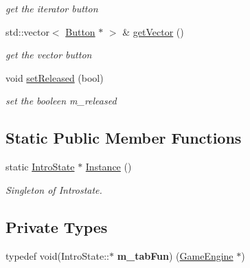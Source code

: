 \begin{DoxyCompactItemize}
\begin{DoxyCompactList}\small\item\em get the iterator button \end{DoxyCompactList}\item 
\hypertarget{class_intro_state_a5e041267d3d4976648a1bd607854ee2c}{}std\+::vector$<$ \hyperlink{class_button}{Button} $\ast$ $>$ \& \hyperlink{class_intro_state_a5e041267d3d4976648a1bd607854ee2c}{get\+Vector} ()\label{class_intro_state_a5e041267d3d4976648a1bd607854ee2c}

\begin{DoxyCompactList}\small\item\em get the vector button \end{DoxyCompactList}\item 
void \hyperlink{class_intro_state_a44e1f222e5870fe447529ff4228acda8}{set\+Released} (bool)
\begin{DoxyCompactList}\small\item\em set the booleen m\+\_\+released \end{DoxyCompactList}\end{DoxyCompactItemize}
\subsection*{Static Public Member Functions}
\begin{DoxyCompactItemize}
\item 
\hypertarget{class_intro_state_ad9c1c5fda023a9568d9798ef4101d1b9}{}static \hyperlink{class_intro_state}{Intro\+State} $\ast$ \hyperlink{class_intro_state_ad9c1c5fda023a9568d9798ef4101d1b9}{Instance} ()\label{class_intro_state_ad9c1c5fda023a9568d9798ef4101d1b9}

\begin{DoxyCompactList}\small\item\em Singleton of Introstate. \end{DoxyCompactList}\end{DoxyCompactItemize}
\subsection*{Private Types}
\begin{DoxyCompactItemize}
\item 
\hypertarget{class_intro_state_a80297b0bfe88e4f6577b7eb9c6ce2156}{}typedef void(Intro\+State\+::$\ast$ {\bfseries m\+\_\+tab\+Fun}) (\hyperlink{class_game_engine}{Game\+Engine} $\ast$)\label{class_intro_state_a80297b0bfe88e4f6577b7eb9c6ce2156}

\end{DoxyCompactItemize}
